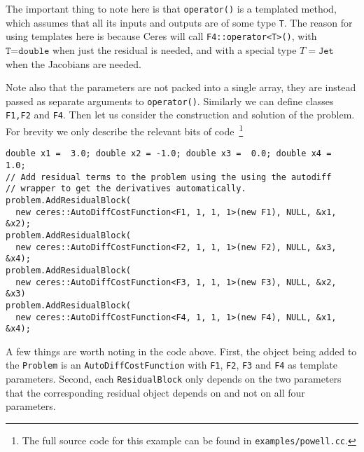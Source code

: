 The important thing to note here is that \texttt{operator()} is a
templated method, which assumes that all its inputs and outputs are of
some type \texttt{T}. The reason for using templates here is because Ceres will call \texttt{F4::operator<T>()}, with $\texttt{T=double}$ when just the residual is needed, and with a special type $T=\texttt{Jet}$ when the Jacobians are needed.

Note also that the parameters are not packed
into a single array, they are instead passed as separate arguments to
\texttt{operator()}. Similarly we can define classes \texttt{F1,F2}
and \texttt{F4}.  Then let us consider the construction and solution of the problem. For brevity we only describe the relevant bits of code~\footnote{The full source code for this example can be found in \texttt{examples/powell.cc}.}
\begin{verbatim}
double x1 =  3.0; double x2 = -1.0; double x3 =  0.0; double x4 =  1.0;
// Add residual terms to the problem using the using the autodiff
// wrapper to get the derivatives automatically. 
problem.AddResidualBlock(
  new ceres::AutoDiffCostFunction<F1, 1, 1, 1>(new F1), NULL, &x1, &x2);
problem.AddResidualBlock(
  new ceres::AutoDiffCostFunction<F2, 1, 1, 1>(new F2), NULL, &x3, &x4);
problem.AddResidualBlock(
  new ceres::AutoDiffCostFunction<F3, 1, 1, 1>(new F3), NULL, &x2, &x3)
problem.AddResidualBlock(
  new ceres::AutoDiffCostFunction<F4, 1, 1, 1>(new F4), NULL, &x1, &x4);
\end{verbatim}
A few things are worth noting in the code above. First, the object
being added to the \texttt{Problem} is an
\texttt{AutoDiffCostFunction} with \texttt{F1}, \texttt{F2}, \texttt{F3} and \texttt{F4} as template parameters. Second, each \texttt{ResidualBlock} only depends on the two parameters that the corresponding residual object depends on and not on all four parameters.


